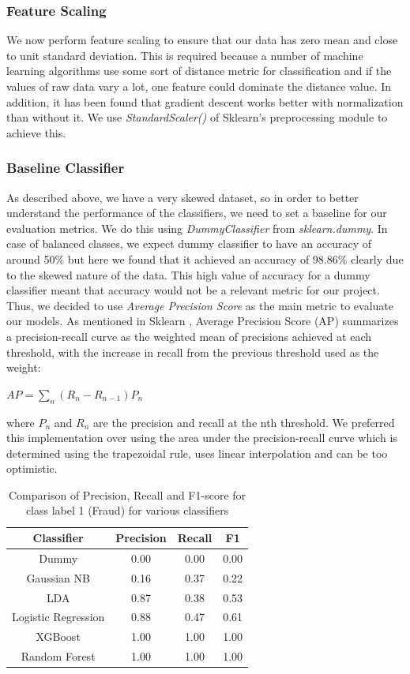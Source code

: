 \documentclass[letterpaper, 12 pt, conference]{ieeeconf}  %
\begin{document}
\subsubsection{Feature Scaling}
We now perform feature scaling to ensure that our data has zero mean and close to unit standard deviation. This is required because a number of machine learning algorithms use some sort of distance metric for classification and if the values of raw data vary a lot, one feature could dominate the distance value. In addition, it has been found that gradient descent works better with normalization than without it. We use \textit{StandardScaler()} of Sklearn's preprocessing module to achieve this.

\subsubsection{Baseline Classifier}
As described above, we have a very skewed dataset, so in order to better understand the performance of the classifiers, we need to set a baseline for our evaluation metrics. We do this using \textit{DummyClassifier} from \textit{sklearn.dummy}. In case of balanced classes, we expect dummy classifier to have an accuracy of around 50\% but here we found that it achieved an accuracy of 98.86\% clearly due to the skewed nature of the data. This high value of accuracy for a dummy classifier meant that accuracy would not be a relevant metric for our project. Thus, we decided to use \textit{Average Precision Score} as the main metric to evaluate our models. As mentioned in Sklearn \cite{avgprecscore}, Average Precision Score (AP) summarizes a precision-recall curve as the weighted mean of precisions achieved at each threshold, with the increase in recall from the previous threshold used as the weight:
\begin{center}
$AP = \sum_{n} (R_{n} - R_{n-1}) P_{n}$
\end{center}
where $P_{n}$ and $R_{n}$ are the precision and recall at the nth threshold. We preferred this implementation over using the area under the precision-recall curve which is determined using the trapezoidal rule, uses linear interpolation and can be too optimistic.

\begin{table}[htbp]
\centering
\small
\begin{tabular}{ c || c c c}
 \hline
    Classifier &  Precision & Recall & F1 \\
   \hline
  Dummy & 0.00 & 0.00 & 0.00 \\
 \hline
  Gaussian NB  & 0.16 & 0.37 & 0.22 \\
   \hline
  LDA & 0.87 & 0.38 & 0.53\\
  \hline
  Logistic Regression   & 0.88 & 0.47 & 0.61 \\
 \hline
 XGBoost & 1.00 & 1.00 & 1.00 \\
 \hline
 Random Forest & 1.00 & 1.00 & 1.00\\
 \hline
\end{tabular}
\caption{Comparison of Precision, Recall and  F1-score for class label 1 (Fraud) for various classifiers}\label{tab:comp_pr}

\end{table}
\end{document}
